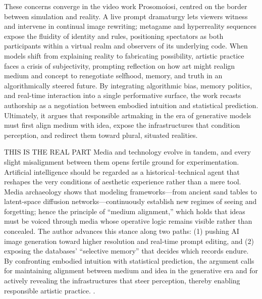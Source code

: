 \documentclass[sigconf,authordraft]{acmart}
\begin{document}
These concerns converge in the video work Prosomoíosi, centred on the border between simulation and reality. A live prompt dramaturgy lets viewers witness and intervene in continual image rewriting; metagame and hyperreality sequences expose the fluidity of identity and rules, positioning spectators as both participants within a virtual realm and observers of its underlying code. When models shift from explaining reality to fabricating possibility, artistic practice faces a crisis of subjectivity, prompting reflection on how art might realign medium and concept to renegotiate selfhood, memory, and truth in an algorithmically steered future.
By integrating algorithmic bias, memory politics, and real-time interaction into a single performative surface, the work recasts authorship as a negotiation between embodied intuition and statistical prediction. Ultimately, it argues that responsible artmaking in the era of generative models must first align medium with idea, expose the infrastructures that condition perception, and redirect them toward plural, situated realities.

THIS IS THE REAL PART
Media and technology evolve in tandem, and every slight misalignment between them opens fertile ground for experimentation. Artificial intelligence should be regarded as a historical–technical agent that reshapes the very conditions of aesthetic experience rather than a mere tool. Media archaeology shows that modeling frameworks—from ancient sand tables to latent-space diffusion networks—continuously establish new regimes of seeing and forgetting; hence the principle of “medium alignment,” which holds that ideas must be voiced through media whose operative logic remains visible rather than concealed. The author advances this stance along two paths: (1) pushing AI image generation toward higher resolution and real-time prompt editing, and (2) exposing the databases’ “selective memory” that decides which records endure. By confronting embodied intuition with statistical prediction, the argument calls for maintaining alignment between medium and idea in the generative era and for actively revealing the infrastructures that steer perception, thereby enabling responsible artistic practice.
.

\end{document}
